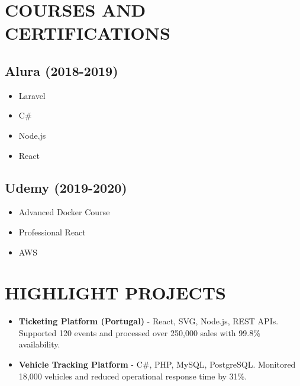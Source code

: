 \documentclass[11pt,a4paper]{article}
\begin{document}
\vspace{15pt}

\section{COURSES AND CERTIFICATIONS}

\begin{minipage}[t]{0.48\textwidth}
    \subsection{Alura (2018-2019)}
    \begin{itemize}[leftmargin=15pt, topsep=0pt, itemsep=1pt]
        \item Laravel
        \item C\#
        \item Node.js
        \item React
    \end{itemize}
\end{minipage}
\hfill
\begin{minipage}[t]{0.48\textwidth}
    \subsection{Udemy (2019-2020)}
    \begin{itemize}[leftmargin=15pt, topsep=0pt, itemsep=1pt]
        \item Advanced Docker Course
        \item Professional React
        \item AWS
    \end{itemize}
\end{minipage}

\vspace{15pt}

\section{HIGHLIGHT PROJECTS}

\begin{itemize}[leftmargin=20pt, topsep=0pt, itemsep=2pt]
    \item \textbf{Ticketing Platform (Portugal)} - React, SVG, Node.js, REST APIs. Supported 120 events and processed over 250,000 sales with 99.8\% availability.
    \item \textbf{Vehicle Tracking Platform} - C\#, PHP, MySQL, PostgreSQL. Monitored 18,000 vehicles and reduced operational response time by 31\%.
\end{itemize}
\end{document}
